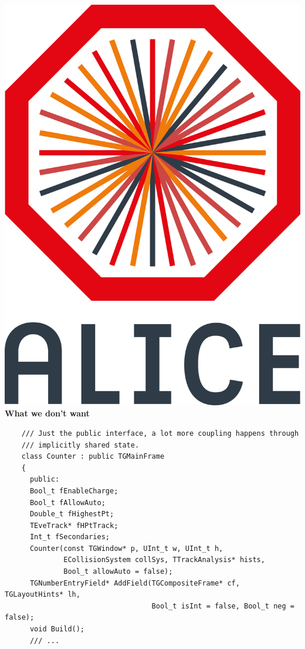\documentclass[aspectratio=169,14pt,dvipsnames]{beamer}
\begin{document}
\begin{frame}[fragile]{\includegraphics[height=0.07\textheight]{2012-Jul-04-4_Color_Logo_CB.png} \hspace{0.2cm}\textbf{What we don't want}}
  \begin{verbatim}
    /// Just the public interface, a lot more coupling happens through
    /// implicitly shared state.
    class Counter : public TGMainFrame
    {
      public:
      Bool_t fEnableCharge;
      Bool_t fAllowAuto;
      Double_t fHighestPt;
      TEveTrack* fHPtTrack;
      Int_t fSecondaries;
      Counter(const TGWindow* p, UInt_t w, UInt_t h,
              ECollisionSystem collSys, TTrackAnalysis* hists,
              Bool_t allowAuto = false);
      TGNumberEntryField* AddField(TGCompositeFrame* cf, TGLayoutHints* lh,
                                   Bool_t isInt = false, Bool_t neg = false);
      void Build();
      /// ...
  \end{verbatim}
\end{frame}
\end{document}
